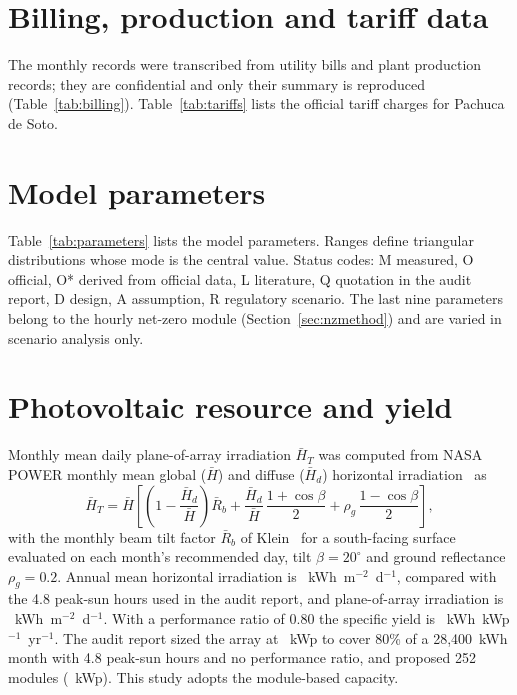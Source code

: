 \documentclass[processes,article,submit,pdftex,moreauthors]{Definitions/mdpi}
\begin{document}
\appendixstart
\appendix


\section{Billing, production and tariff data}
\label{app:data}
The monthly records were transcribed from utility bills and plant production records; they are confidential and only their summary is reproduced (Table~\ref{tab:billing}). Table~\ref{tab:tariffs} lists the official tariff charges for Pachuca de Soto.



\section{Model parameters}
\label{app:params}
Table~\ref{tab:parameters} lists the model parameters. Ranges define triangular distributions whose mode is the central value. Status codes: M measured, O official, O* derived from official data, L literature, Q quotation in the audit report, D design, A assumption, R regulatory scenario. The last nine parameters belong to the hourly net-zero module (Section~\ref{sec:nzmethod}) and are varied in scenario analysis only.


\section{Photovoltaic resource and yield}
\label{app:pv}
Monthly mean daily plane-of-array irradiation $\bar H_T$ was computed from NASA POWER monthly mean global ($\bar H$) and diffuse ($\bar H_d$) horizontal irradiation~\cite{nasapower} as
\begin{equation}
\bar H_T = \bar H\left[\left(1-\frac{\bar H_d}{\bar H}\right)\bar R_b + \frac{\bar H_d}{\bar H}\,\frac{1+\cos\beta}{2} + \rho_g\,\frac{1-\cos\beta}{2}\right],
\end{equation}
with the monthly beam tilt factor $\bar R_b$ of Klein~\cite{klein1977} for a south-facing surface evaluated on each month's recommended day, tilt $\beta = 20^\circ$ and ground reflectance $\rho_g=0.2$. Annual mean horizontal irradiation is \nGHI~kWh~m$^{-2}$~d$^{-1}$, compared with the 4.8 peak-sun hours used in the audit report, and plane-of-array irradiation is \nPOA~kWh~m$^{-2}$~d$^{-1}$. With a performance ratio of 0.80 the specific yield is \nSpecYield~kWh~kWp$^{-1}$~yr$^{-1}$. The audit report sized the array at \nStuKWp~kWp to cover 80\% of a 28,400~kWh month with 4.8 peak-sun hours and no performance ratio, and proposed 252 modules (\nStuKWpMod~kWp). This study adopts the module-based capacity.
\end{document}
